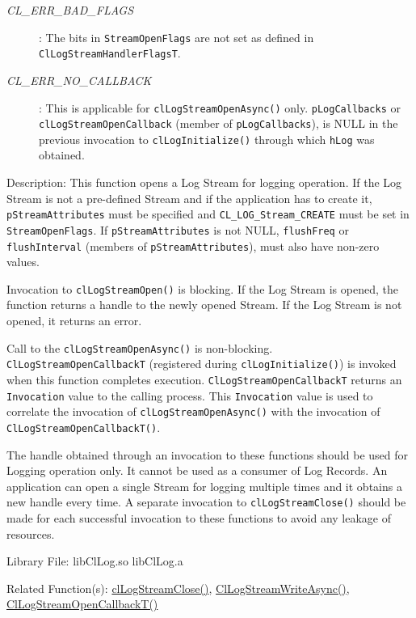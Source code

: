 \begin{flushleft}
\begin{Desc}
\begin{description}
\item[{\em CL\_\-ERR\_\-BAD\_\-FLAGS}]: The bits in {\tt{StreamOpenFlags}} are not set as defined in {\tt{ClLogStreamHandlerFlagsT}}.

\item[{\em CL\_\-ERR\_\-NO\_\-CALLBACK}]: This is applicable for {\tt{clLogStreamOpenAsync()}} only. {\tt{pLogCallbacks}} or {\tt{clLogStreamOpenCallback}}
(member of {\tt{pLogCallbacks}}), is NULL in the previous invocation to {\tt{clLogInitialize()}} through which {\tt{hLog}} was obtained.

\end{description}
\end{Desc}

\begin{Desc}
\item[Description:] This function opens a Log Stream for logging operation. If the Log Stream is not a pre-defined Stream and if the application has to
create it, {\tt{pStreamAttributes}} must be specified and {\tt{CL\_\-LOG\_\-Stream\_\-CREATE}} must be set in {\tt{StreamOpenFlags}}.
If {\tt{pStreamAttributes}} is not NULL, {\tt{flushFreq}} or {\tt{flushInterval}} (members of {\tt{pStreamAttributes}}), must also have non-zero values.
\par
Invocation to {\tt{clLogStreamOpen()}} is blocking. If the Log Stream is opened, the function returns a handle to the newly opened Stream. 
If the Log Stream is not opened, it returns an error.
\par
Call to the {\tt{clLogStreamOpenAsync()}} is non-blocking.  
{\tt{ClLogStreamOpenCallbackT}} (registered during {\tt{clLogInitialize()}}) is invoked when this function completes execution. {\tt{ClLogStreamOpenCallbackT}}
returns an {\tt{Invocation}} value to the calling process. This {\tt{Invocation}} value is used to correlate the invocation of {\tt{clLogStreamOpenAsync()}} with 
the invocation of {\tt{ClLogStreamOpenCallbackT()}}.
\par
The handle obtained through an invocation to these functions should be used for Logging operation only. It cannot be used as a consumer of Log Records.
An application can open a single Stream for logging multiple times and it obtains a new handle every time. A separate invocation to 
{\tt{clLogStreamClose()}} should be made for each successful invocation to these functions to avoid any leakage of resources.

\end{Desc}

\begin{Desc}
\item[Library File:] libClLog.so\newline
libClLog.a\end{Desc}
\begin{Desc}
\item[Related Function(s):]\hyperlink{pagelog108}{clLogStreamClose()}, \hyperlink{pagelog109}{ClLogStreamWriteAsync()},
\hyperlink{pagelog107}{ClLogStreamOpenCallbackT()}\end{Desc}
\newpage





\end{flushleft}
